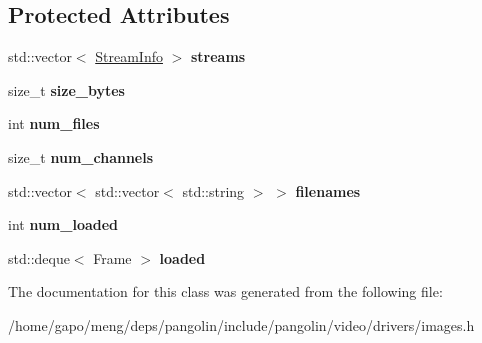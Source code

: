 \subsection*{Protected Attributes}
\begin{DoxyCompactItemize}
\item 
std\+::vector$<$ \hyperlink{classpangolin_1_1_stream_info}{Stream\+Info} $>$ {\bfseries streams}\hypertarget{classpangolin_1_1_images_video_a696d2cc58b128dd4033220a91c4f0af4}{}\label{classpangolin_1_1_images_video_a696d2cc58b128dd4033220a91c4f0af4}

\item 
size\+\_\+t {\bfseries size\+\_\+bytes}\hypertarget{classpangolin_1_1_images_video_a2992a5c6e66f2747d09875295cac4400}{}\label{classpangolin_1_1_images_video_a2992a5c6e66f2747d09875295cac4400}

\item 
int {\bfseries num\+\_\+files}\hypertarget{classpangolin_1_1_images_video_a758687525003bba42394f1db963b5502}{}\label{classpangolin_1_1_images_video_a758687525003bba42394f1db963b5502}

\item 
size\+\_\+t {\bfseries num\+\_\+channels}\hypertarget{classpangolin_1_1_images_video_a72baeb13ff3121ba43f33704b6f4e331}{}\label{classpangolin_1_1_images_video_a72baeb13ff3121ba43f33704b6f4e331}

\item 
std\+::vector$<$ std\+::vector$<$ std\+::string $>$ $>$ {\bfseries filenames}\hypertarget{classpangolin_1_1_images_video_a0dea552b8047455a9435440247b9478b}{}\label{classpangolin_1_1_images_video_a0dea552b8047455a9435440247b9478b}

\item 
int {\bfseries num\+\_\+loaded}\hypertarget{classpangolin_1_1_images_video_ae00d18be0b64078830e3e2b4e4661d68}{}\label{classpangolin_1_1_images_video_ae00d18be0b64078830e3e2b4e4661d68}

\item 
std\+::deque$<$ Frame $>$ {\bfseries loaded}\hypertarget{classpangolin_1_1_images_video_adacbd4c70a781a02f8d8042796884fb9}{}\label{classpangolin_1_1_images_video_adacbd4c70a781a02f8d8042796884fb9}

\end{DoxyCompactItemize}


The documentation for this class was generated from the following file\+:\begin{DoxyCompactItemize}
\item 
/home/gapo/meng/deps/pangolin/include/pangolin/video/drivers/images.\+h\end{DoxyCompactItemize}
